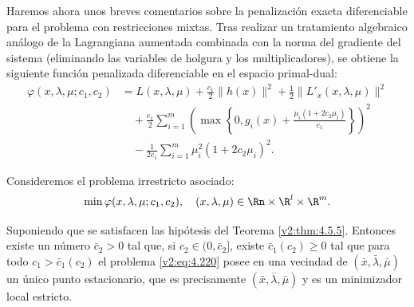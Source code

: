 Haremos ahora unos breves comentarios sobre la penalización exacta diferenciable para el problema con restricciones mixtas. Tras realizar un tratamiento algebraico análogo de la Lagrangiana aumentada combinada con la norma del gradiente del sistema (eliminando las variables de holgura y los multiplicadores), se obtiene la siguiente función penalizada diferenciable en el espacio primal-dual:
\begin{align}
    \varphi(x, \lambda, \mu; c_1, c_2) &= L(x, \lambda, \mu) + \frac{c_1}{2} \|h(x)\|^2 + \frac{1}{2} \|L'_x(x, \lambda, \mu)\|^2 \nonumber \\
    &\quad + \frac{c_1}{2} \sum_{i=1}^m \left( \max\left\{0, g_i(x) + \frac{\mu_i(1 + 2c_2 \mu_i)}{c_1}\right\} \right)^2 \nonumber \\
    &\quad - \frac{1}{2c_1} \sum_{i=1}^m \mu_i^2 (1 + 2c_2 \mu_i)^2. \label{v2:eq:4.219}
\end{align}

Consideremos el problema irrestricto asociado:
\begin{equation}
    \min \varphi(x, \lambda, \mu; c_1, c_2), \quad (x, \lambda, \mu) \in \Rn \times \R^l \times \R^m. \label{v2:eq:4.220}
\end{equation}

\begin{theorem}\label{v2:thm:4.5.8}
Suponiendo que se satisfacen las hipótesis del Teorema \ref{v2:thm:4.5.5}. Entonces existe un número $\bar{c}_2 > 0$ tal que, si $c_2 \in (0, \bar{c}_2]$, existe $\bar{c}_1(c_2) \ge 0$ tal que para todo $c_1 > \bar{c}_1(c_2)$ el problema \eqref{v2:eq:4.220} posee en una vecindad de $(\bar{x}, \bar{\lambda}, \bar{\mu})$ un único punto estacionario, que es precisamente $(\bar{x}, \bar{\lambda}, \bar{\mu})$ y es un minimizador local estricto.
\end{theorem}
